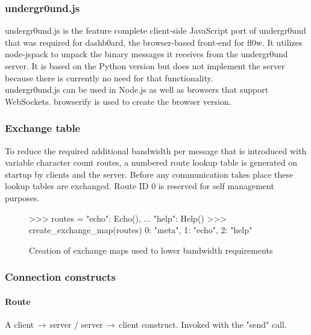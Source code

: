 \documentclass[conference,a4paper]{IEEEtran}
\begin{document}
\subsubsection{undergr0und.js}
undergr0und.js\cite{undergr0und.js:Philip Trauner} is the feature complete client-side JavaScript\cite{ECMAScript:Ecma} port of undergr0und\cite{undergr0und:Philip Trauner} that was required for dashb0ard\cite{dashb0ard:Sebastian Schaffler}, the browser-based front-end for fl0w\cite{fl0w:Philip Trauner}. It utilizes node-jspack\cite{node-jspack:Peter Griess} to unpack the binary messages it receives from the undergr0und server. It is based on the Python\cite{Python:Python Foundation} version but does not implement the server because there is currently no need for that functionality. \\undergr0und.js can be used in Node.js\cite{Node.js:Node.js Foundation} as well as browsers that support WebSockets\cite{The WebSocket Protocol:A. Melnikov}. browserify\cite{browserify:James Halliday} is used to create the browser version.\\

\subsubsection{Exchange table}
To reduce the required additional bandwidth per message that is introduced with variable character count routes, a numbered route lookup table is generated on startup by clients and the server. Before any communication takes place these lookup tables are exchanged. Route ID 0 is reserved for self management purposes.\\

\begin{figure}[H]
\centering
\begin{python}
>>> routes = {"echo": Echo(),
...    "help": Help()}
>>> create_exchange_map(routes)
{0: "meta", 1: "echo", 2: "help"}
\end{python}
\caption{Creation of exchange maps used to lower bandwidth requirements}
\end{figure}

\subsubsection{Connection constructs}
\paragraph{Route}
A client$\,\to\,$server / server$\,\to\,$client construct. Invoked with the {\color{deepgreen}"send"} call.
\end{document}
